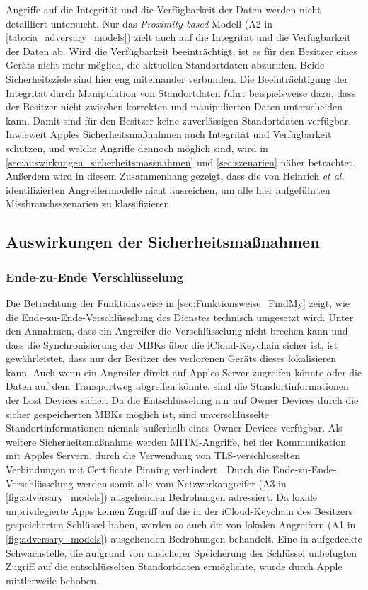 Angriffe auf die Integrität und die Verfügbarkeit der Daten werden \cite{Heinrich_FindMy} nicht detailliert untersucht.
Nur das \textit{Proximity-based} Modell (A2 in \autoref{tab:cia_adversary_models}) zielt auch auf die Integrität und die Verfügbarkeit der Daten ab.
Wird die Verfügbarkeit beeinträchtigt, ist es für den Besitzer eines Geräts nicht mehr möglich, die aktuellen Standortdaten abzurufen.
Beide Sicherheitsziele sind hier eng miteinander verbunden.
Die Beeinträchtigung der Integrität durch Manipulation von Standortdaten führt beispielsweise dazu, dass der Besitzer nicht zwischen korrekten und manipulierten Daten unterscheiden kann.
Damit sind für den Besitzer keine zuverlässigen Standortdaten verfügbar.
Inwieweit Apples Sicherheitsmaßnahmen auch Integrität und Verfügbarkeit schützen, und welche Angriffe dennoch möglich sind, wird in \autoref{sec:auswirkungen_sicherheitsmassnahmen} und \autoref{sec:szenarien} näher betrachtet.
Außerdem wird in diesem Zusammenhang gezeigt, dass die von Heinrich \textit{et al.} \cite{Heinrich_FindMy} identifizierten Angreifermodelle nicht ausreichen, um alle hier aufgeführten Missbrauchsszenarien zu klassifizieren.

\subsection{Auswirkungen der Sicherheitsmaßnahmen}
\label{sec:auswirkungen_sicherheitsmassnahmen}

\subsubsection{Ende-zu-Ende Verschlüsselung}
Die Betrachtung der Funktionsweise in \autoref{sec:Funktionsweise_FindMy} zeigt, wie die Ende-zu-Ende-Verschlüsselung des Dienstes technisch umgesetzt wird.
Unter den Annahmen, dass ein Angreifer die Verschlüsselung nicht brechen kann und dass die Synchronisierung der \acp{MBK} über die iCloud-Keychain sicher ist, ist gewährleistet, dass nur der Besitzer des verlorenen Geräts dieses lokalisieren kann.
Auch wenn ein Angreifer direkt auf Apples Server zugreifen könnte oder die Daten auf dem Transportweg abgreifen könnte, sind die Standortinformationen der Lost Devices sicher.
Da die Entschlüsselung nur auf Owner Devices durch die sicher gespeicherten \acp{MBK} möglich ist, sind unverschlüsselte Standortinformationen niemals außerhalb eines Owner Devices verfügbar.
Als weitere Sicherheitsmaßnahme werden \ac{MITM}-Angriffe, bei der Kommunikation mit Apples Servern, durch die Verwendung von \ac{TLS}-verschlüsselten Verbindungen mit Certificate Pinning verhindert \cite{Heinrich_FindMy}.
Durch die Ende-zu-Ende-Verschlüsselung werden somit alle vom Netzwerkangreifer (A3 in \autoref{fig:adversary_models}) ausgehenden Bedrohungen adressiert.
Da lokale unprivilegierte Apps keinen Zugriff auf die in der iCloud-Keychain des Besitzers gespeicherten Schlüssel haben, werden so auch die von  lokalen Angreifern (A1 in \autoref{fig:adversary_models}) ausgehenden Bedrohungen behandelt.
Eine in \cite{Heinrich_FindMy} aufgedeckte Schwachstelle, die aufgrund von unsicherer Speicherung der Schlüssel unbefugten Zugriff auf die entschlüsselten Standortdaten ermöglichte, wurde durch Apple mittlerweile behoben.

